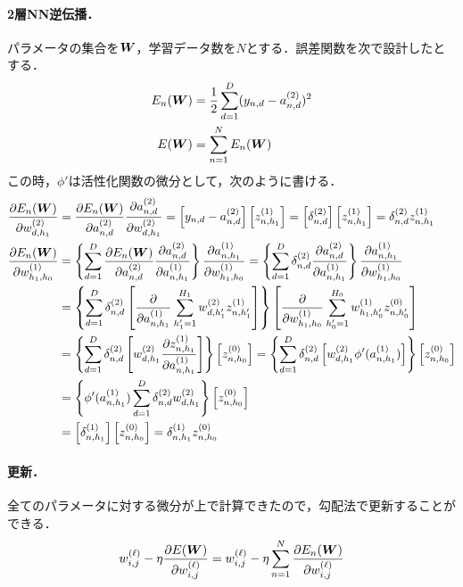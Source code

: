 \paragraph{2層NN逆伝播．}
パラメータの集合を$\mbox{\boldmath $W$}$，学習データ数を$N$とする．誤差関数を次で設計したとする．
\begin{align*}
 E_n(\mbox{\boldmath $W$}) &= \frac{1}{2}\sum_{d=1}^D (y_{n,d}-a^{(2)}_{n,d})^2
\\
 E(\mbox{\boldmath $W$}) &= \sum_{n=1}^N E_n(\mbox{\boldmath $W$})
\end{align*}
この時，$\phi'$は活性化関数の微分として，次のように書ける．
\begin{align*}
 \frac{\partial E_n(\mbox{\boldmath $W$})}{\partial w^{(2)}_{d,h_1}}
 &=
 \frac{\partial E_n(\mbox{\boldmath $W$})}{\partial a^{(2)}_{n,d}}  \frac{\partial a^{(2)}_{n,d}}{\partial w^{(2)}_{d,h_1}}
=
 \left[ y_{n,d}-a^{(2)}_{n,d}\right] \left[ z^{(1)}_{n,h_1}\right]
=\left[\delta^{(2)}_{n,d}\right] \left[ z^{(1)}_{n,h_1}\right]
=\delta^{(2)}_{n,d} z^{(1)}_{n,h_1}
\\
\frac{\partial E_n(\mbox{\boldmath $W$})}{\partial w^{(1)}_{h_1,h_0}}
&=
\left\{
\sum_{d=1}^D
\frac{\partial E_n(\mbox{\boldmath $W$})}{\partial a^{(2)}_{n,d}}
\frac{\partial a^{(2)}_{n,d}}{\partial a^{(1)}_{n,h_1}}
\right\}
\frac{\partial a^{(1)}_{n,h_1}}{\partial w^{(1)}_{h_1,h_0}}
=
\left\{
\sum_{d=1}^D\delta^{(2)}_{n,d}
\frac{\partial a^{(2)}_{n,d}}{\partial a^{(1)}_{n,h_1}}
\right\}
\frac{\partial a^{(1)}_{n,h_1}}{\partial w^{(1)}_{h_1,h_0}}
\\
&=
\left\{
\sum_{d=1}^D\delta^{(2)}_{n,d}
\left[ \frac{\partial}{\partial a^{(1)}_{n,h_1}}\sum_{h_1'=1}^{H_1}w^{(2)}_{d,h_1'}z^{(1)}_{n,h_1'}\right]
\right\}
\left[\frac{\partial}{\partial w^{(1)}_{h_1,h_0}}\sum_{h_0'=1}^{H_0} w^{(1)}_{h_1,h_0'}z^{(0)}_{n,h_0'}\right]
\\
&=
\left\{
\sum_{d=1}^D\delta^{(2)}_{n,d}
\left[ w^{(2)}_{d,h_1} \frac{\partial z^{(1)}_{n,h_1}}{\partial a^{(1)}_{n,h_1}} \right]
\right\}
\left[z^{(0)}_{n,h_0}\right]
=
\left\{
\sum_{d=1}^D\delta^{(2)}_{n,d}
\left[ w^{(2)}_{d,h_1} \phi'(a^{(1)}_{n,h_1}) \right]
\right\}
\left[z^{(0)}_{n,h_0}\right]
\\
&=
\left\{
\phi'(a^{(1)}_{n,h_1}) \sum_{d=1}^D\delta^{(2)}_{n,d} w^{(2)}_{d,h_1}
\right\}
\left[z^{(0)}_{n,h_0}\right]
\\
&=
\left[ \delta^{(1)}_{n,h_1} \right]
\left[z^{(0)}_{n,h_0}\right]
=
\delta^{(1)}_{n,h_1}
z^{(0)}_{n,h_0}
\end{align*}

\paragraph{更新．}
全てのパラメータに対する微分が上で計算できたので，勾配法で更新することができる．
\begin{align*}
 w_{i,j}^{(\ell)} - \eta \frac{\partial E(\mbox{\boldmath $W$})}{\partial w_{i,j}^{(\ell)}}
 =
 w_{i,j}^{(\ell)} - \eta \sum_{n=1}^N \frac{\partial E_n(\mbox{\boldmath $W$})}{\partial w_{i,j}^{(\ell)}}
\end{align*}

